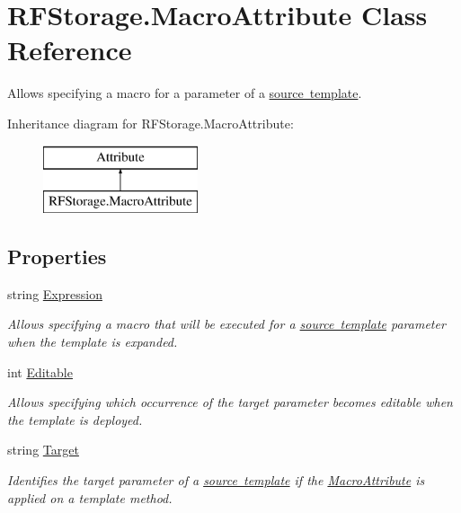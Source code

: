 \hypertarget{class_r_f_storage_1_1_macro_attribute}{}\section{R\+F\+Storage.\+Macro\+Attribute Class Reference}
\label{class_r_f_storage_1_1_macro_attribute}


Allows specifying a macro for a parameter of a \mbox{\hyperlink{class_r_f_storage_1_1_source_template_attribute}{source template}}.  


Inheritance diagram for R\+F\+Storage.\+Macro\+Attribute\+:\begin{figure}[H]
\begin{center}
\leavevmode
\includegraphics[height=2.000000cm]{class_r_f_storage_1_1_macro_attribute}
\end{center}
\end{figure}
\subsection*{Properties}
\begin{DoxyCompactItemize}
\item 
string \mbox{\hyperlink{class_r_f_storage_1_1_macro_attribute_ad83d620afa226d505e41e9ba1ee94289}{Expression}}
\begin{DoxyCompactList}\small\item\em Allows specifying a macro that will be executed for a \mbox{\hyperlink{class_r_f_storage_1_1_source_template_attribute}{source template}} parameter when the template is expanded. \end{DoxyCompactList}\item 
int \mbox{\hyperlink{class_r_f_storage_1_1_macro_attribute_a2d233fa663b08429c167e4309725d4b8}{Editable}}
\begin{DoxyCompactList}\small\item\em Allows specifying which occurrence of the target parameter becomes editable when the template is deployed. \end{DoxyCompactList}\item 
string \mbox{\hyperlink{class_r_f_storage_1_1_macro_attribute_a78ff3b444cf65ac2e858be45a8de9a02}{Target}}
\begin{DoxyCompactList}\small\item\em Identifies the target parameter of a \mbox{\hyperlink{class_r_f_storage_1_1_source_template_attribute}{source template}} if the \mbox{\hyperlink{class_r_f_storage_1_1_macro_attribute}{Macro\+Attribute}} is applied on a template method. \end{DoxyCompactList}\end{DoxyCompactItemize}


